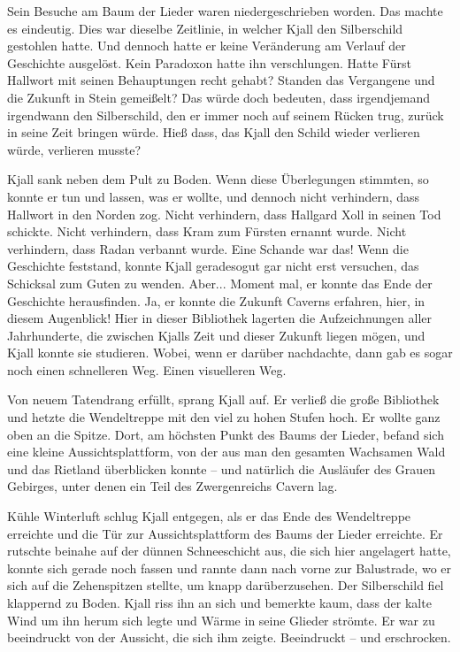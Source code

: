 Sein Besuche am Baum der Lieder waren niedergeschrieben worden. Das machte es eindeutig. Dies war dieselbe Zeitlinie, in welcher Kjall den Silberschild gestohlen hatte. Und dennoch hatte er keine Veränderung am Verlauf der Geschichte ausgelöst. Kein Paradoxon hatte ihn verschlungen. Hatte Fürst Hallwort mit seinen Behauptungen recht gehabt? Standen das Vergangene und die Zukunft in Stein gemeißelt? Das würde doch bedeuten, dass irgendjemand irgendwann den Silberschild, den er immer noch auf seinem Rücken trug, zurück in seine Zeit bringen würde. Hieß dass, das Kjall den Schild wieder verlieren würde, verlieren musste?

Kjall sank neben dem Pult zu Boden. Wenn diese Überlegungen stimmten, so konnte er tun und lassen, was er wollte, und dennoch nicht verhindern, dass Hallwort in den Norden zog. Nicht verhindern, dass Hallgard Xoll in seinen Tod schickte. Nicht verhindern, dass Kram zum Fürsten ernannt wurde. Nicht verhindern, dass Radan verbannt wurde. Eine Schande war das! Wenn die Geschichte feststand, konnte Kjall geradesogut gar nicht erst versuchen, das Schicksal zum Guten zu wenden. Aber... Moment mal, er konnte das Ende der Geschichte herausfinden. Ja, er konnte die Zukunft Caverns erfahren, hier, in diesem Augenblick! Hier in dieser Bibliothek lagerten die Aufzeichnungen aller Jahrhunderte, die zwischen Kjalls Zeit und dieser Zukunft liegen mögen, und Kjall konnte sie studieren. Wobei, wenn er darüber nachdachte, dann gab es sogar noch einen schnelleren Weg. Einen visuelleren Weg.

Von neuem Tatendrang erfüllt, sprang Kjall auf. Er verließ die große Bibliothek und hetzte die Wendeltreppe mit den viel zu hohen Stufen hoch. Er wollte ganz oben an die Spitze. Dort, am höchsten Punkt des Baums der Lieder, befand sich eine kleine Aussichtsplattform, von der aus man den gesamten Wachsamen Wald und das Rietland überblicken konnte – und natürlich die Ausläufer des Grauen Gebirges, unter denen ein Teil des Zwergenreichs Cavern lag.\bigskip



Kühle Winterluft schlug Kjall entgegen, als er das Ende des Wendeltreppe erreichte und die Tür zur Aussichtsplattform des Baums der Lieder erreichte. Er rutschte beinahe auf der dünnen Schneeschicht aus, die sich hier angelagert hatte, konnte sich gerade noch fassen und rannte dann nach vorne zur Balustrade, wo er sich auf die Zehenspitzen stellte, um knapp darüberzusehen. Der Silberschild fiel klappernd zu Boden. Kjall riss ihn an sich und bemerkte kaum, dass der kalte Wind um ihn herum sich legte und Wärme in seine Glieder strömte. Er war zu beeindruckt von der Aussicht, die sich ihm zeigte. Beeindruckt – und erschrocken.\bigskip



